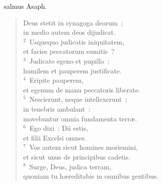 \bchapter[Psalm]
salmus Asaph. \begin{verse}Deus stetit in synagoga deorum~;\\ in medio autem deos dijudicat.\\
${}^{2}$~Usquequo judicatis iniquitatem,\\ et facies peccatorum sumitis~?\\
${}^{3}$~Judicate egeno et pupillo~;\\ humilem et pauperem justificate.\\
${}^{4}$~Eripite pauperem,\\ et egenum de manu peccatoris liberate.\\
${}^{5}$~Nescierunt, neque intellexerunt~;\\ in tenebris ambulant~:\\ movebuntur omnia fundamenta terr\ae .\\
${}^{6}$~Ego dixi~: Dii estis,\\ et filii Excelsi omnes.\\
${}^{7}$~Vos autem sicut homines moriemini,\\ et sicut unus de principibus cadetis.\\
${}^{8}$~Surge, Deus, judica terram,\\ quoniam tu h\ae reditabis in omnibus gentibus.\end{verse}



